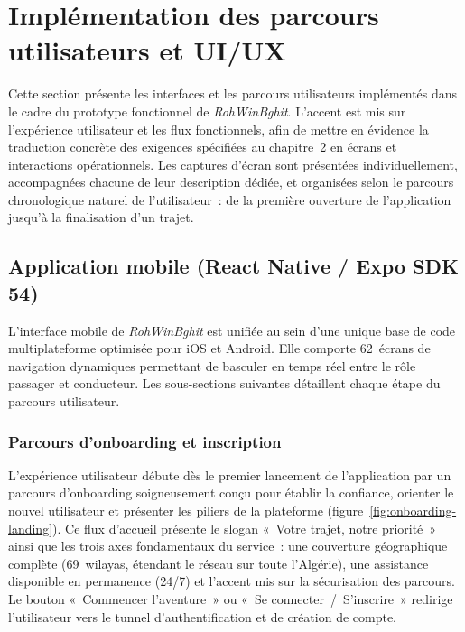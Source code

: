 \section{Implémentation des parcours utilisateurs et UI/UX}
\label{sec:implementation}

Cette section présente les interfaces et les parcours utilisateurs implémentés dans le cadre du prototype fonctionnel de \textit{RohWinBghit}. L'accent est mis sur l'expérience utilisateur et les flux fonctionnels, afin de mettre en évidence la traduction concrète des exigences spécifiées au chapitre~2 en écrans et interactions opérationnels. Les captures d'écran sont présentées individuellement, accompagnées chacune de leur description dédiée, et organisées selon le parcours chronologique naturel de l'utilisateur~: de la première ouverture de l'application jusqu'à la finalisation d'un trajet.

\subsection{Application mobile (React Native / Expo SDK 54)}
\label{sec:realisation-mobile}

L'interface mobile de \textit{RohWinBghit} est unifiée au sein d'une unique base de code multiplateforme optimisée pour iOS et Android. Elle comporte 62~écrans de navigation dynamiques permettant de basculer en temps réel entre le rôle passager et conducteur. Les sous-sections suivantes détaillent chaque étape du parcours utilisateur.

\subsubsection{Parcours d'onboarding et inscription}
\label{sec:onboarding}

L'expérience utilisateur débute dès le premier lancement de l'application par un parcours d'onboarding soigneusement conçu pour établir la confiance, orienter le nouvel utilisateur et présenter les piliers de la plateforme (figure~\ref{fig:onboarding-landing}). Ce flux d'accueil présente le slogan «~Votre trajet, notre priorité~» ainsi que les trois axes fondamentaux du service~: une couverture géographique complète (69~wilayas, étendant le réseau sur toute l'Algérie), une assistance disponible en permanence (24/7) et l'accent mis sur la sécurisation des parcours. Le bouton «~Commencer l'aventure~» ou «~Se connecter~/~S'inscrire~» redirige l'utilisateur vers le tunnel d'authentification et de création de compte.

